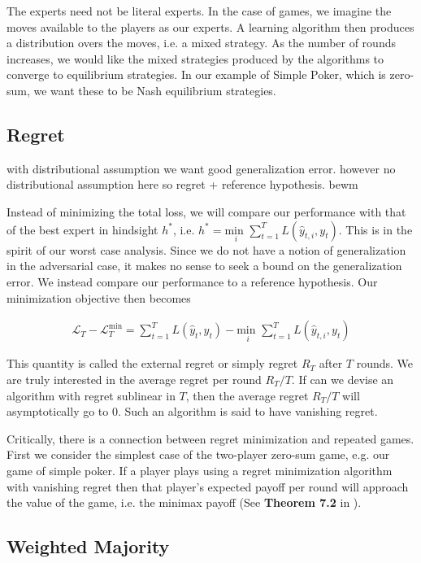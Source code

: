 \documentclass{article}
\begin{document}
The experts need not be literal experts. In the case of games, we imagine the moves available to the players as our experts. A learning algorithm then produces a distribution overs the moves, i.e. a mixed strategy. As the number of rounds increases, we would like the mixed strategies produced by the algorithms to converge to equilibrium strategies. In our example of Simple Poker, which is zero-sum, we want these to be Nash equilibrium strategies.

\subsection{Regret}

with distributional assumption we want good generalization error. however no distributional assumption here so regret + reference hypothesis. bewm

Instead of minimizing the total loss, we will compare our performance with that of the best expert in hindsight $h^*$, i.e. $h^* = \underset{i}{\text{min }} \sum_{t=1}^T L(\hat y_{t,i}, y_t)$. This is in the spirit of our worst case analysis. Since we do not have a notion of generalization in the adversarial case, it makes no sense to seek a bound on the generalization error. We instead compare our performance to a reference hypothesis. Our minimization objective then becomes

\begin{align*}
\mathcal{L}_T - \mathcal{L}_T^{\text{min}} = \sum_{t=1}^T L(\hat y_t, y_t) - \underset{i}{\text{min }} \sum_{t=1}^T L(\hat y_{t,i}, y_t)
\end{align*}

This quantity is called the external regret or simply regret $R_T$ after $T$ rounds. We are truly interested in the average regret per round $R_T/T$. If can we devise an algorithm with regret sublinear in $T$, then the average regret $R_T/T$ will asymptotically go to 0. Such an algorithm is said to have vanishing regret.

Critically, there is a connection between regret minimization and repeated games. First we consider the simplest case of the two-player zero-sum game, e.g. our game of simple poker. If a player plays using a regret minimization algorithm with vanishing regret then that player's expected payoff per round will approach the value of the game, i.e. the minimax payoff (See \textbf{Theorem 7.2} in \cite{cesa2006prediction}).

\subsection{Weighted Majority}
\end{document}

